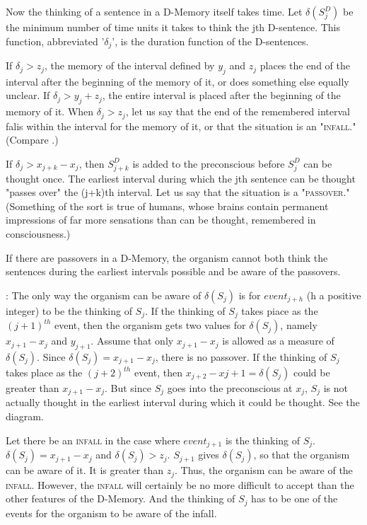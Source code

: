 Now the thinking of a sentence in a D-Memory itself takes time. Let 
$\delta(S^D_j)$ be the minimum number of time units it takes to think the jth 
D-sentence. This function, abbreviated '$\delta_j$', is the duration function of the 
D-sentences. 

 If $\delta_j\greater z_j$, the memory of the interval defined by $y_j$ and 
$z_j$ places the end of the interval after the beginning of the memory of it, or 
does something else equally unclear. If $\delta_j\greater y_j+z_j$, the entire interval is placed 
after the beginning of the memory of it. When $\delta_j\greater z_j$, let us say that the end 
of the remembered interval falis within the interval for the memory of it, or 
that the situation is an "\textsc{infall}." (Compare .)

 If $\delta_j\greater x_{j+k}-x_j$, then $S^D_{j+k}$ is added to the preconscious 
before $S^D_j$ can be thought once. The earliest interval during which the jth 
sentence can be thought "passes over" the (j+k)th interval. Let us say that 
the situation is a "\textsc{passover}." (Something of the sort is true of humans, 
whose brains contain permanent impressions of far more sensations than can 
be thought, remembered in consciousness.) 

 If there are passovers in a D-Memory, the organism 
cannot both think the sentences during the earliest intervals possible and be 
aware of the passovers. 

\proof: The only way the organism can be aware of $\delta(S_j)$
is for $event_{j+h}$ (h a positive integer) to be the thinking of $S_j$. 
If the thinking of $S_j$ takes piace as the $(j+1)^{th}$ event, then the organism gets two 
values for $\delta(S_j)$, namely $x_{j+1}-x_j$ and $y_{j+1}$. Assume that only $x_{j+1}-x_j$
is allowed as a measure of $\delta(S_j)$. Since $\delta(S_j)=x_{j+1}-x_j$, there is no passover. If 
the thinking of $S_j$ takes place as the $(j+2)^{th}$ event, then $x_{j+2}-x{j+1}=\delta(S_j)$
could be greater than $x_{j+1}-x_j$. But since $S_j$ goes into the preconscious at $x_j$, 
$S_j$ is not actually thought in the earliest interval during which it could be 
thought. See the diagram. 


 Let there be an \textsc{infall} in the case where $event_{j+1}$ is the 
thinking of $S_j$. $\delta(S_j)=x_{j+1}-x_j$ and $\delta(S_j)\greater z_j$. $S_{j+1}$ gives $\delta(S_j)$, 
so that the organism can be aware of it. 
It is greater than $z_j$. Thus, the organism can be 
aware of the \textsc{infall}. However, the \textsc{infall} will certainly be no more difficult to 
accept than the other features of the D-Memory. And the thinking of $S_j$ has 
to be one of the events for the organism to be aware of the infall. 

